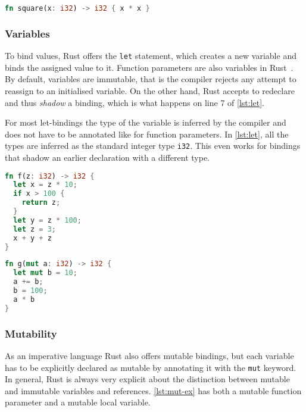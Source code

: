 \begin{lstlisting}[style=short, language=Rust, caption={A simple Rust function.}, label=lst:first-ex]
fn square(x: i32) -> i32 { x * x }
\end{lstlisting}

\subsubsection{Variables}

To bind values, Rust offers the \lstinline!let! statement, which creates a new
variable and binds the assigned value to it. Function parameters are also
variables in Rust~\cite{rustref}. By default, variables are immutable, that is
the compiler rejects any attempt to reassign to an initialised variable. On the
other hand, Rust accepts to redeclare and thus \emph{shadow} a binding, which is
what happens on line 7 of \autoref{lst:let}.

For most let-bindings the type of the variable is inferred by the compiler and
does not have to be annotated like for function parameters. In
\autoref{lst:let}, all the types are inferred as the standard integer type
\lstinline!i32!. This even works for bindings that shadow an earlier declaration
with a different type.

\noindent\begin{minipage}[t]{.45\textwidth}
\begin{lstlisting}[language=Rust, caption={A Rust function doing some arithmetics.}, label=lst:let]
fn f(z: i32) -> i32 {
  let x = z * 10;
  if x > 100 {
    return z;
  }
  let y = z * 100;
  let z = 3;
  x + y + z
}
\end{lstlisting}
\end{minipage}\hfill
\begin{minipage}[t]{.45\textwidth}
\begin{lstlisting}[language=Rust, caption={Mutable variable bindings.}, label=lst:mut-ex]
fn g(mut a: i32) -> i32 {
  let mut b = 10;
  a += b;
  b = 100;
  a * b
}
\end{lstlisting}
\end{minipage}

\subsubsection{Mutability}

As an imperative language Rust also offers mutable bindings, but each variable
has to be explicitly declared as mutable by annotating it with the
\lstinline!mut! keyword. In general, Rust is always very explicit about the
distinction between mutable and immutable variables and references.
\autoref{lst:mut-ex} has both a mutable function parameter and a mutable local
variable.

